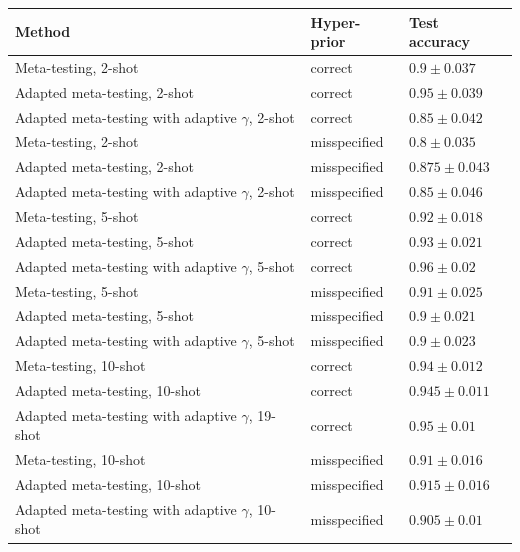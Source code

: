 \documentclass{article}
\theoremstyle{definition}
\begin{document}
\begin{table}	
	
	\centering
	\begin{tabular}{lll}
		\toprule
		Method   & Hyper-prior  & Test accuracy   \\
		\midrule
		Meta-testing, 2-shot & correct   & $0.9\pm 0.037 $      \\
		Adapted meta-testing, 2-shot & correct   & $0.95\pm 0.039$      \\
		Adapted meta-testing with adaptive $\gamma$, 2-shot & correct   & $0.85\pm 0.042$      \\
		\midrule
		Meta-testing, 2-shot & misspecified   & $0.8\pm 0.035 $      \\
		Adapted meta-testing, 2-shot & misspecified   & $0.875\pm 0.043$      \\
		Adapted meta-testing with adaptive $\gamma$, 2-shot & misspecified   & $0.85\pm 0.046$    \\
		\midrule 
		
		Meta-testing, 5-shot & correct   & $0.92\pm 0.018 $      \\
		Adapted meta-testing, 5-shot & correct   & $0.93\pm 0.021$      \\
		Adapted meta-testing with adaptive $\gamma$, 5-shot & correct   & $0.96\pm 0.02$      \\
		\midrule
		Meta-testing, 5-shot & misspecified   & $0.91\pm 0.025 $      \\
		Adapted meta-testing, 5-shot & misspecified   & $0.9\pm 0.021$      \\
		Adapted meta-testing with adaptive $\gamma$, 5-shot & misspecified   & $0.9\pm 0.023$ \\   
		\midrule
		
		Meta-testing, 10-shot & correct   & $0.94\pm 0.012 $      \\
		Adapted meta-testing, 10-shot & correct   & $0.945\pm 0.011$      \\
		Adapted meta-testing with adaptive $\gamma$, 19-shot & correct   & $0.95\pm 0.01$      \\
		\midrule
		Meta-testing, 10-shot & misspecified   & $0.91\pm 0.016 $      \\
		Adapted meta-testing, 10-shot & misspecified   & $0.915\pm 0.016$      \\
		Adapted meta-testing with adaptive $\gamma$, 10-shot & misspecified   & $0.905\pm 0.01$    \\
		\midrule
		

\end{tabular}
\end{table}
\end{document}
